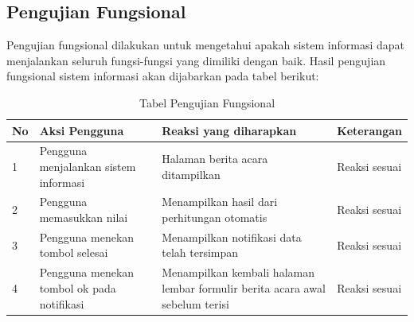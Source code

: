 		
		\subsection{Pengujian Fungsional}
		\label{sub: PFungsional}
		Pengujian fungsional dilakukan untuk mengetahui apakah sistem informasi dapat menjalankan seluruh fungsi-fungsi yang dimiliki dengan baik. Hasil pengujian fungsional sistem informasi akan dijabarkan pada tabel berikut:\\
		
	\begin{table}[htbp]
		\centering
		\caption{Tabel Pengujian Fungsional}
		\begin{tabular}{| m{0.75cm} | m{7cm} | m{5cm} | m{3cm} |}
			\hline
			No & Aksi Pengguna & Reaksi yang diharapkan & Keterangan \\
			\hline
			1 & Pengguna menjalankan sistem informasi & Halaman berita acara ditampilkan & Reaksi sesuai \\
			\hline
			2 & Pengguna memasukkan nilai & Menampilkan hasil dari perhitungan otomatis & Reaksi sesuai \\
			\hline
			3 & Pengguna menekan tombol selesai & Menampilkan notifikasi data telah tersimpan & Reaksi sesuai \\
			\hline
			4 & Pengguna menekan tombol ok pada notifikasi & Menampilkan kembali halaman lembar formulir berita acara awal sebelum terisi & Reaksi sesuai \\
			\hline
		\end{tabular}
	\end{table}